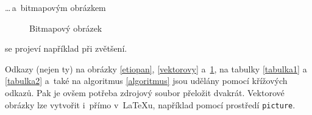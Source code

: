 \documentclass[a4paper,11pt]{article}
\begin{document}
\bigskip

\noindent \dots\,a~bitmapovým obrázkem

\begin{figure}[h]
\centering
\caption{Bitmapový obrázek}
\label{bitmapovy}
\end{figure}

\bigskip
\noindent se projeví například při zvětšení.

Odkazy (nejen ty) na obrázky \ref{etiopan}, \ref{vektorovy} a~\ref{bitmapovy}, na   tabulky \ref{tabulka1} a \ref{tabulka2} a~také na algoritmus \ref{algoritmus} jsou udělány pomocí  křížových odkazů. Pak je ovšem potřeba zdrojový soubor přeložit dvakrát. Vektorové obrázky lze vytvořit i~přímo v~\LaTeX u, například pomocí prostředí \texttt{picture}.
\end{document}
